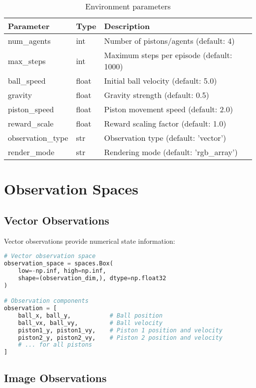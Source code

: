 \begin{table}[H]
\centering
\begin{tabular}{|l|l|l|}
\hline
\textbf{Parameter} & \textbf{Type} & \textbf{Description} \\
\hline
num\_agents & int & Number of pistons/agents (default: 4) \\
max\_steps & int & Maximum steps per episode (default: 1000) \\
ball\_speed & float & Initial ball velocity (default: 5.0) \\
gravity & float & Gravity strength (default: 0.5) \\
piston\_speed & float & Piston movement speed (default: 2.0) \\
reward\_scale & float & Reward scaling factor (default: 1.0) \\
observation\_type & str & Observation type (default: 'vector') \\
render\_mode & str & Rendering mode (default: 'rgb_array') \\
\hline
\end{tabular}
\caption{Environment parameters}
\end{table}

\section{Observation Spaces}

\subsection{Vector Observations}

Vector observations provide numerical state information:

\begin{lstlisting}[language=python, caption=Vector Observations]
# Vector observation space
observation_space = spaces.Box(
    low=-np.inf, high=np.inf, 
    shape=(observation_dim,), dtype=np.float32
)

# Observation components
observation = [
    ball_x, ball_y,           # Ball position
    ball_vx, ball_vy,         # Ball velocity
    piston1_y, piston1_vy,    # Piston 1 position and velocity
    piston2_y, piston2_vy,    # Piston 2 position and velocity
    # ... for all pistons
]
\end{lstlisting}

\subsection{Image Observations}

